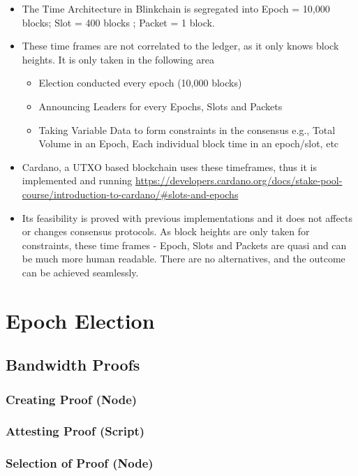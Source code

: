 \documentclass[a4paper,11pt]{article}
\begin{document}
\begin{itemize}
\item The Time Architecture in Blinkchain is segregated into Epoch = 10,000 blocks; Slot = 400 blocks ; Packet = 1 block.
\item These time frames are not correlated to the ledger, as it only knows block heights. It is only taken in the following area
\begin{itemize}
\item Election conducted every epoch (10,000 blocks)
\item Announcing Leaders for every Epochs, Slots and Packets
\item Taking Variable Data to form constraints in the consensus e.g., Total Volume in an Epoch, Each individual block time in an epoch/slot, etc
\end{itemize}
\item Cardano, a UTXO based blockchain uses these timeframes, thus it is implemented and running \url{https://developers.cardano.org/docs/stake-pool-course/introduction-to-cardano/#slots-and-epochs}
\item Its feasibility is proved with previous implementations and it does not affects or changes consensus protocols. As block heights are only taken for constraints, these time frames - Epoch, Slots and Packets are quasi and can be much more human readable. There are no alternatives, and the outcome can be achieved seamlessly.
\end{itemize}

\section{Epoch Election}

\subsection{Bandwidth Proofs}

\subsubsection{Creating Proof (Node)}

\subsubsection{Attesting Proof (Script)}

\subsubsection{Selection of Proof (Node)}
\end{document}
